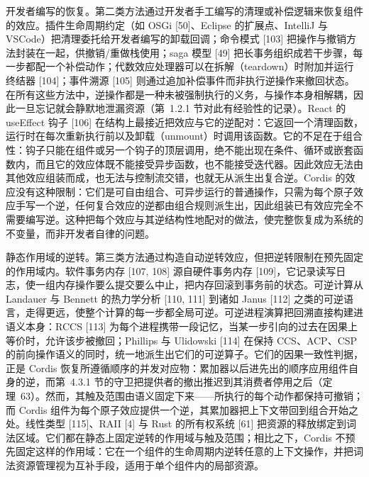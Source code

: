 开发者编写的恢复。第二类方法通过开发者手工编写的清理或补偿逻辑来恢复组件的效应。插件生命周期约定（如 OSGi {[}50{]}、Eclipse 的扩展点、IntelliJ 与 VSCode）把清理委托给开发者编写的卸载回调；命令模式 {[}103{]} 把操作与撤销方法封装在一起，供撤销/重做栈使用；saga 模型 {[}49{]} 把长事务组织成若干步骤，每一步都配一个补偿动作；代数效应处理器可以在拆解（teardown）时附加并运行终结器 {[}104{]}；事件溯源 {[}105{]} 则通过追加补偿事件而非执行逆操作来撤回状态。在所有这些方法中，逆操作都是一种未被强制执行的义务，与操作本身相解耦，因此一旦忘记就会静默地泄漏资源（第~1.2.1 节对此有经验性的记录）。React 的 useEffect 钩子 {[}106{]} 在结构上最接近把效应与它的逆配对：它返回一个清理函数，运行时在每次重新执行前以及卸载（unmount）时调用该函数。它的不足在于组合性：钩子只能在组件或另一个钩子的顶层调用，绝不能出现在条件、循环或嵌套函数内，而且它的效应体既不能接受异步函数，也不能接受迭代器。因此效应无法由其他效应组装而成，也无法与控制流交错，也就无从派生出复合逆。Cordis 的效应没有这种限制：它们是可自由组合、可异步运行的普通操作，只需为每个原子效应手写一个逆，任何复合效应的逆都由组合规则派生出，因此组装已有效应完全不需要编写逆。这种把每个效应与其逆结构性地配对的做法，使完整恢复成为系统的不变量，而非开发者自律的问题。

静态作用域的逆转。第三类方法通过构造自动逆转效应，但把逆转限制在预先固定的作用域内。软件事务内存 {[}107, 108{]} 源自硬件事务内存 {[}109{]}，它记录读写日志，使一组内存操作要么提交要么中止，把内存回滚到事务前的状态。可逆计算从 Landauer 与 Bennett 的热力学分析 {[}110, 111{]} 到诸如 Janus {[}112{]} 之类的可逆语言，走得更远，使整个计算的每一步都全局可逆。可逆进程演算把回溯直接构建进语义本身：RCCS {[}113{]} 为每个进程携带一段记忆，当某一步引向的过去在因果上等价时，允许该步被撤回；Phillips 与 Ulidowski {[}114{]} 在保持 CCS、ACP、CSP 的前向操作语义的同时，统一地派生出它们的可逆算子。它们的因果一致性判据，正是 Cordis 恢复所遵循顺序的并发对应物：累加器以后进先出的顺序应用组件自身的逆，而第~4.3.1 节的守卫把提供者的撤出推迟到其消费者停用之后（定理~63）。然而，其触及范围由语义固定下来——所执行的每个动作都保持可撤销；而 Cordis 组件为每个原子效应提供一个逆，其累加器把上下文带回到组合开始之处。线性类型 {[}115{]}、RAII {[}4{]} 与 Rust 的所有权系统 {[}61{]} 把资源的释放绑定到词法区域。它们都在静态上固定逆转的作用域与触及范围；相比之下，Cordis 不预先固定这样的作用域：它在一个组件的生命周期内逆转任意的上下文操作，并把词法资源管理视为互补手段，适用于单个组件内的局部资源。

